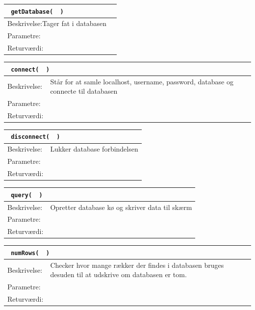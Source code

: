 \begin{table}[H]
\begin{tabular}{l p{12.5cm}}
\multicolumn{2}{l}{\texttt{\textcolor{blue}{} getDatabase( \textcolor{blue}{} )}} \\
\hline
Beskrivelse:Tager fat i databasen\\
Parametre:&\\
Returværdi:&\\
\end{tabular}
\end{table}

\begin{table}[H]
\begin{tabular}{l p{12.5cm}}
\multicolumn{2}{l}{\texttt{\textcolor{blue}{} connect( \textcolor{blue}{} )}} \\
\hline
Beskrivelse:&Står for at samle localhost, username, password, database og connecte til databasen\\
Parametre:&\\
Returværdi:&\\
\end{tabular}
\end{table}

\begin{table}[H]
\begin{tabular}{l p{12.5cm}}
\multicolumn{2}{l}{\texttt{\textcolor{blue}{} disconnect( \textcolor{blue}{} )}} \\
\hline
Beskrivelse:&Lukker database forbindelsen\\
Parametre:&\\
Returværdi:&\\
\end{tabular}
\end{table}

\begin{table}[H]
\begin{tabular}{l p{12.5cm}}
\multicolumn{2}{l}{\texttt{\textcolor{blue}{} query( \textcolor{blue}{} )}} \\
\hline
Beskrivelse:&Opretter database kø og skriver data til skærm\\
Parametre:&\\
Returværdi:&\\
\end{tabular}
\end{table}

\begin{table}[H]
\begin{tabular}{l p{12.5cm}}
\multicolumn{2}{l}{\texttt{\textcolor{blue}{} numRows( \textcolor{blue}{} )}} \\
\hline
Beskrivelse:&Checker hvor mange rækker der findes i databasen bruges desuden til at udskrive om databasen er tom.\\
Parametre:&\\
Returværdi:&\\
\end{tabular}
\end{table}

